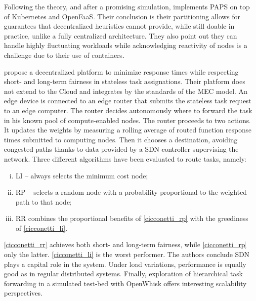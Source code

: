 \begin{description}[leftmargin=10pt]
	Following the theory, and after a promising simulation, \citet{baresi_paps_2021} implements \gls{PAPS} on top of Kubernetes and OpenFaaS. Their conclusion is their partitioning allows for guarantees that decentralized heuristics cannot provide, while still doable in practice, unlike a fully centralized architecture. They also point out they can handle highly fluctuating workloads while acknowledging reactivity of nodes is a challenge due to their use of containers.
	
	\item[\citet{cicconetti_decentralized_2021}] propose a decentralized platform to minimize response times while respecting short- and long-term fairness in stateless task assignations. Their platform does not extend to the Cloud and integrates by the standards of the \gls{MEC} model. An edge device is connected to an edge router that submits the stateless task request to an edge computer. The router decides autonomously where to forward the task in his known pool of compute-enabled nodes. The router proceeds to two actions. It updates the weights by measuring a rolling average of routed function response times submitted to computing nodes. Then it chooses a destination, avoiding congested paths thanks to data provided by a \gls{SDN} controller supervising the network. Three different algorithms have been evaluated to route tasks, namely:
	\begin{enumerate}[(i)]
		\item \label{cicconetti_li} \gls{LI} -- always selects the minimum cost node;
		\item \label{cicconetti_rp} \gls{RP} -- selects a random node with a probability proportional to the weighted path to that node;
		\item \label{cicconetti_rr} \gls{RR} combines the proportional benefits of \cref{cicconetti_rp} with the greediness of \cref{cicconetti_li}.
	\end{enumerate}
	\cref{cicconetti_rr} achieves both short- and long-term fairness, while \cref{cicconetti_rp} only the latter. \cref{cicconetti_li} is the worst performer.
	The authors conclude \gls{SDN} plays a capital role in the system. Under load variations, performance is equally good as in regular distributed systems. Finally, exploration of hierarchical task forwarding in a simulated test-bed with OpenWhisk offers interesting scalability perspectives.
	

\end{description}
